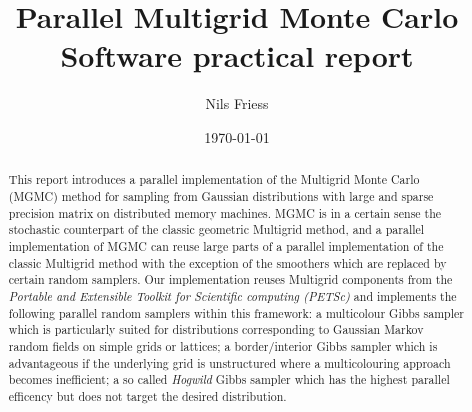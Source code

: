 \documentclass[
fontsize=11pt,
paper=a4,
numbers=noenddot,
parskip=half
]{scrartcl}
\title{Parallel Multigrid Monte Carlo\\
{\normalsize Software practical report}}
\date{\today}
\author{Nils Friess}
\begin{document}
 
\maketitle

\begin{abstract}
    This report introduces a parallel implementation of the Multigrid Monte Carlo (MGMC) method for sampling from Gaussian distributions with large and sparse precision matrix on distributed memory machines. MGMC is in a certain sense the stochastic counterpart of the classic geometric Multigrid method, and a parallel implementation of MGMC can reuse large parts of a parallel implementation of the classic Multigrid method with the exception of the smoothers which are replaced by certain random samplers. Our implementation reuses Multigrid components from the \emph{Portable and Extensible Toolkit for Scientific computing (PETSc)} and implements the following parallel random samplers within this framework: a multicolour Gibbs sampler which is particularly suited for distributions corresponding to Gaussian Markov random fields on simple grids or lattices; a border/interior Gibbs sampler which is advantageous if the underlying grid is unstructured where a multicolouring approach becomes inefficient; a so called \emph{Hogwild} Gibbs sampler which has the highest parallel efficency but does not target the desired distribution.  
\end{abstract}

\printbibliography
\end{document}
